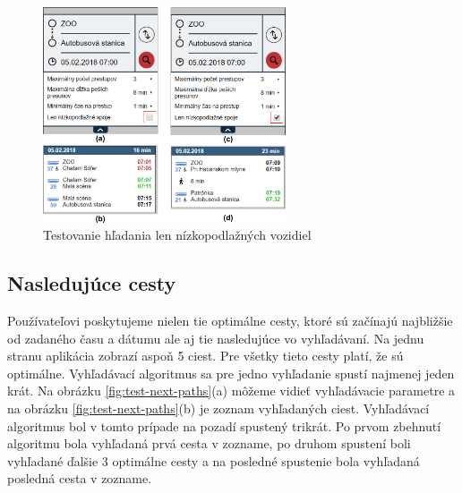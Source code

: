 \begin{figure}[H]
\centerline{\includegraphics[width=0.64\textwidth]{images/test/low-floor}}
\caption[Testovanie hľadania len nízkopodlažných vozidiel]{Testovanie hľadania len nízkopodlažných vozidiel}
\label{fig:test-low-floor}
\end{figure}

\subsection{Nasledujúce cesty}
Používateľovi poskytujeme nielen tie optimálne cesty, ktoré sú začínajú najbližšie od zadaného času a dátumu ale aj tie nasledujúce vo vyhľadávaní. Na jednu stranu aplikácia zobrazí aspoň 5 ciest. Pre všetky tieto cesty platí, že sú optimálne. Vyhľadávací algoritmus sa pre jedno vyhľadanie spustí najmenej jeden krát. Na obrázku \ref{fig:test-next-paths}(a) môžeme vidieť vyhľadávacie parametre a na obrázku \ref{fig:test-next-paths}(b) je zoznam vyhľadaných ciest. Vyhľadávací algoritmus bol v tomto prípade na pozadí spustený trikrát. Po prvom zbehnutí algoritmu bola vyhľadaná prvá cesta v zozname, po druhom spustení boli vyhľadané ďalšie 3 optimálne cesty a na posledné spustenie bola vyhľadaná posledná cesta v zozname.

